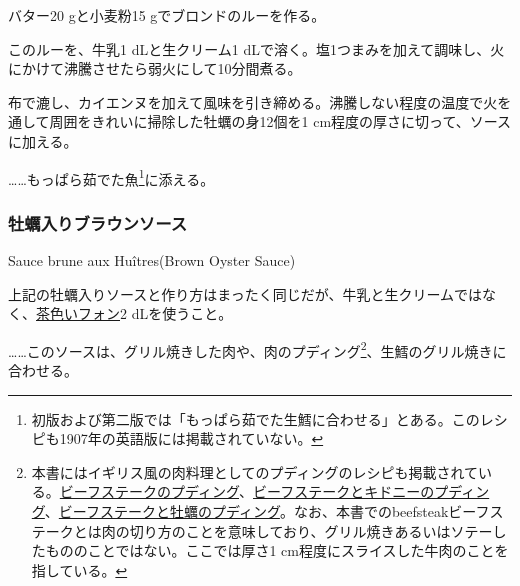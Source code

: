 \begin{recette}
バター20 gと小麦粉15 gでブロンドのルーを作る。

このルーを、牛乳1 dLと生クリーム1
dLで溶く。塩1つまみを加えて調味し、火にかけて沸騰させたら弱火にして10分間煮る。

布で漉し、カイエンヌを加えて風味を引き締める。沸騰しない程度の温度で火を通して周囲をきれいに掃除した牡蠣の身12個を1
cm程度の厚さに切って、ソースに加える。

\ldots{}\ldots{}もっぱら茹でた魚\footnote{初版および第二版では「もっぱら茹でた生鱈に合わせる」とある。このレシピも1907年の英語版には掲載されていない。}に添える。

\atoaki{}

\hypertarget{brown-oyster-sauce}{%
\subsubsection{牡蠣入りブラウンソース}\label{brown-oyster-sauce}}

\begin{frsubenv}

Sauce brune aux Huîtres\hspace{1em}\normalfont(Brown Oyster Sauce)

\end{frsubenv}


上記の牡蠣入りソースと作り方はまったく同じだが、牛乳と生クリームではなく、\protect\hyperlink{fonds-brun}{茶色いフォン}2
dLを使うこと。

\ldots{}\ldots{}このソースは、グリル焼きした肉や、肉のプディング\footnote{本書にはイギリス風の肉料理としてのプディングのレシピも掲載されている。\protect\hyperlink{beefteak-pudding}{ビーフステークのプディング}、\protect\hyperlink{beefsteak-and-kidney-pudding}{ビーフステークとキドニーのプディング}、\protect\hyperlink{beefsteak-and-oysters-pudding}{ビーフステークと牡蠣のプディング}。なお、本書でのbeefsteakビーフステークとは肉の切り方のことを意味しており、グリル焼きあるいはソテーしたもののことではない。ここでは厚さ1
  cm程度にスライスした牛肉のことを指している。}、生鱈のグリル焼きに合わせる。


\end{recette}
